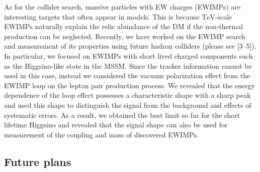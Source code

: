 \documentclass[12pt,notitlepage]{article}
\def\rem#1{ {\bf\textcolor{red}{($\clubsuit$ #1 $\clubsuit$)}}}
\begin{document}
As for the collider search, massive particles with EW charges (EWIMPs) are interesting targets that often appear in models.
This is because $\mathrm{TeV}$-scale EWIMPs naturally explain the relic abundance of the DM if the non-thermal production can be neglected.
Recently, we have worked on the EWIMP search and measurement of its properties using future hadron colliders (please see [3--5]).
In particular, we focused on EWIMPs with short lived charged components such as the Higgsino-like state in the MSSM.
Since the tracker information cannot be used in this case, instead we considered the vacuum polarization effect from the EWIMP loop on the lepton pair production process.
We revealed that the energy dependence of the loop effect possesses a characteristic shape with a sharp peak and used this shape to distinguish the signal from the background and effects of systematic errors.
As a result, we obtained the best limit so far for the short lifetime Higgsino and revealed that the signal shape can also be used for measurement of the coupling and mass of discovered EWIMPs.





\vspace*{-2mm}
\subsection*{Future plans}
\end{document}
